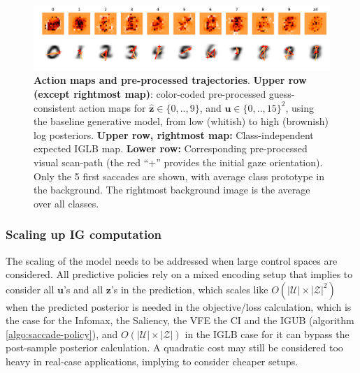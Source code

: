 \documentclass[12pt,twoside,openright]{article}
\begin{document}
\begin{figure}
	\includegraphics[width=\linewidth]{img/frontiers_sal_maps.pdf}
	\caption{\textbf{Action maps and pre-processed trajectories}. \textbf{Upper row (except rightmost map)}: color-coded pre-processed guess-consistent action maps for $\hat{\boldsymbol{z}} \in \{0,..,9\}$, and $\boldsymbol{u} \in \{0,..,15\}^2$, using the baseline generative model, from low (whitish) to high (brownish) log posteriors. \textbf{Upper row, rightmost map:} Class-independent expected IGLB map.
	\textbf{Lower row:} Corresponding pre-processed visual scan-path (the red ``+'' provides the initial gaze orientation). Only the 5 first saccades are shown, with average class prototype in the background. The rightmost background image is the average over all classes.}\label{fig:pre-processed}
\end{figure}

\subsubsection{Scaling up IG computation}
The scaling of the model needs to be addressed when large control spaces are considered. All predictive policies rely on a mixed encoding setup that implies to consider all $\boldsymbol{u}$'s and all $\boldsymbol{z}$'s in the prediction, which scales like $O(|\mathcal{U}|\times|\mathcal{Z}|^2)$ when the predicted posterior is needed in the objective/loss calculation, which is the case for the Infomax, the Saliency, the VFE the CI and the IGUB (algorithm \ref{algo:saccade-policy}), and $O(|\mathcal{U}|\times|\mathcal{Z}|)$ in the IGLB case for it can bypass the post-sample posterior calculation. A quadratic cost may still be considered too heavy in real-case applications, implying to consider cheaper setups. 
\end{document}
